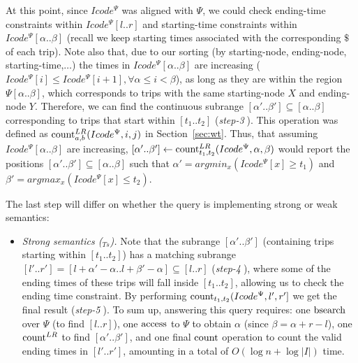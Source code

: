 \begin{itemize}
		At this point, since $Icode^{\Psi}$  was aligned with $\Psi$, 
		we could check ending-time constraints within $Icode^{\Psi}[l..r]$  and starting-time constraints 
		within $Icode^{\Psi}[\alpha..\beta]$ (recall we keep starting times associated with the corresponding $\$$ of each trip).
		Note also that, due to our sorting (by starting-node, ending-node, starting-time,$\dots$) the times in $Icode^{\Psi}[\alpha..\beta]$ are 
		increasing ($Icode^{\Psi}[i] \leq Icode^{\Psi}[i+1], \forall \alpha \leq i < \beta$), as long as they are within the region $\Psi[\alpha..\beta]$, which corresponds to trips with the same starting-node $X$ and ending-node $Y$.
		Therefore, we can find the continuous subrange $[\alpha'..\beta'] \subseteq [\alpha..\beta] $ corresponding to trips
		that start within $[t_1..t_2]$ ({\em step-\textcircled{3}}).
		This operation was defined as $\operatorname{count}^{LR}_{a, b}(Icode^{\Psi},i,j)$ in Section~\ref{sec:wt}.
		Thus, that assuming $Icode^{\Psi}[\alpha..\beta]$ are increasing,  
		$[\alpha'..\beta'] \leftarrow \operatorname{count}^{LR}_{t_1,t_2}(Icode^{\Psi},\alpha,\beta)$ would report the 
		positions $[\alpha'..\beta'] \subseteq [\alpha..\beta]$ such that $\alpha' = argmin_{x} (Icode^{\Psi}[x] \geq t_1)$ and
		$\beta' = argmax_{x} (Icode^{\Psi}[x] \leq t_2)$.
		
		
		The last step will differ on whether the query is implementing strong or weak semantics:
		
		\begin{itemize} 
			\item {\em Strong semantics (\XtoY$_{Ts}$).} Note that the subrange $[\alpha'..\beta']$ (containing trips starting within $[t_1..t_2]$) 
			has a matching subrange $[l'..r'] = [l+\alpha'-\alpha..l+\beta'-\alpha] \subseteq [l..r]$ ({\em step-\textcircled{4}}), where some of the ending times of these trips will fall inside 
			$[t_1..t_2]$, allowing us to check the ending time constraint. By performing  $\operatorname{count}_{t_1,t_2}(Icode^{\Psi},l',r']$  we get the final result 
			({\em step-\textcircled{5}}). 
			To sum up, answering this query  requires: one $\operatorname{bsearch}$ over $\Psi$ (to find $[l..r]$), one $\operatorname{access}$ to $\Psi$ to obtain
			 $\alpha$ (since $\beta = \alpha+r-l$), one $\operatorname{count}^{LR}$ to find $[\alpha'..\beta']$, and one final $\operatorname{count}$ operation to count the valid ending times in $[l'..r']$, amounting in a total of $O(\log n + \log|I|)$ time.
			

\end{itemize}
\end{itemize}
